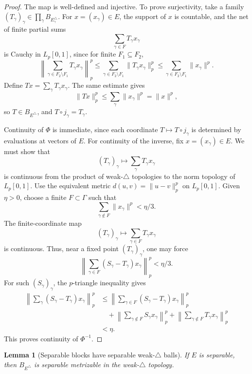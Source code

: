 \documentclass[11pt]{article}
\newtheorem{lemma}{Lemma}
\newcommand{\Lp}{L_p[0,1]}
\begin{document}
\begin{proof}
The map is well-defined and injective.  To prove surjectivity, take a family
\((T_\gamma)_\gamma\in\prod_\gamma B_{E_\gamma^\triangle}\).  For
\(x=(x_\gamma)\in E\), the support of \(x\) is countable, and the net of
finite partial sums
\[
  \sum_{\gamma\in F} T_\gamma x_\gamma
\]
is Cauchy in \(\Lp\), since for finite \(F_1\subseteq F_2\),
\[
  \left\|\sum_{\gamma\in F_2\setminus F_1}T_\gamma x_\gamma\right\|_p^p
  \leq \sum_{\gamma\in F_2\setminus F_1}\|T_\gamma x_\gamma\|_p^p
  \leq \sum_{\gamma\in F_2\setminus F_1}\|x_\gamma\|^p.
\]
Define \(Tx=\sum_\gamma T_\gamma x_\gamma\).  The same estimate gives
\[
  \|Tx\|_p^p\leq \sum_\gamma \|x_\gamma\|^p=\|x\|^p,
\]
so \(T\in B_{E^\triangle}\), and \(T\circ j_\gamma=T_\gamma\).

Continuity of \(\Phi\) is immediate, since each coordinate \(T\mapsto T\circ
j_\gamma\) is determined by evaluations at vectors of \(E\).  For continuity
of the inverse, fix \(x=(x_\gamma)\in E\).  We must show that
\[
  (T_\gamma)_\gamma \longmapsto \sum_\gamma T_\gamma x_\gamma
\]
is continuous from the product of weak-\(\triangle\) topologies to the norm
topology of \(\Lp\).  Use the equivalent metric
\(d(u,v)=\|u-v\|_p^p\) on \(\Lp\).  Given \(\eta>0\), choose a finite
\(F\subset\Gamma\) such that
\[
  \sum_{\gamma\notin F}\|x_\gamma\|^p<\eta/3.
\]
The finite-coordinate map
\[
  (T_\gamma)_\gamma\longmapsto \sum_{\gamma\in F}T_\gamma x_\gamma
\]
is continuous.  Thus, near a fixed point \((T_\gamma)_\gamma\), one may force
\[
  \left\|\sum_{\gamma\in F}(S_\gamma-T_\gamma)x_\gamma\right\|_p^p<\eta/3.
\]
For such \((S_\gamma)_\gamma\), the \(p\)-triangle inequality gives
\[
\begin{aligned}
  \left\|\sum_\gamma(S_\gamma-T_\gamma)x_\gamma\right\|_p^p
  &\leq
  \left\|\sum_{\gamma\in F}(S_\gamma-T_\gamma)x_\gamma\right\|_p^p\\
  &\quad+\left\|\sum_{\gamma\notin F}S_\gamma x_\gamma\right\|_p^p
       +\left\|\sum_{\gamma\notin F}T_\gamma x_\gamma\right\|_p^p\\
  &<\eta .
\end{aligned}
\]
This proves continuity of \(\Phi^{-1}\).
\end{proof}

\begin{lemma}[Separable blocks have separable weak-\(\triangle\) balls]
\label{lem:separable}
If \(E\) is separable, then \(B_{E^\triangle}\) is separable metrizable in the
weak-\(\triangle\) topology.
\end{lemma}
\end{document}
